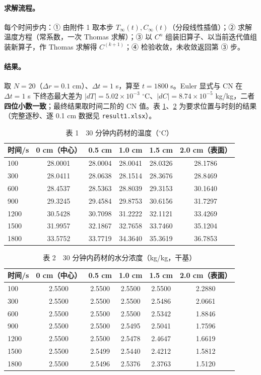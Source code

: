 \documentclass[12pt,a4paper]{ctexart}
\begin{document}
\paragraph{求解流程。} 每个时间步内：① 由附件 1 取本步 $T_\infty(t),C_\infty(t)$（分段线性插值）；② 求解温度方程（常系数，一次 Thomas 求解）；③ 以 $C^n$ 组装旧算子、以当前迭代值组装新算子，作 Thomas 求解得 $C^{(k+1)}$；④ 检验收敛，未收敛返回第 ③ 步。

\paragraph{结果。} 取 $N=20$（$\Delta r=0.1$ cm）、$\Delta t=1$ s，算至 $t=1800$ s。Euler 显式与 CN 在 $\Delta t=1$ s 下终态最大差为 $|dT|=5.02\times10^{-3}$ $^\circ$C、$|dC|=8.74\times10^{-5}$ kg/kg，二者\textbf{四位小数一致}；最终结果取时间二阶的 CN 值。表 \ref{tab:T}、\ref{tab:C} 为要求位置与时刻的结果（完整逐秒、逐 0.1 cm 数据见 \texttt{result1.xlsx}）。

\begin{table}[H]
\centering
\caption{表 1　30 分钟内药材的温度（$^\circ$C）}
\label{tab:T}
\begin{tabular}{lccccc}
\toprule
时间/s & 0 cm（中心） & 0.5 cm & 1.0 cm & 1.5 cm & 2.0 cm（表面） \\
\midrule
100  & 28.0001 & 28.0004 & 28.0041 & 28.0326 & 28.1786 \\
300  & 28.0411 & 28.0638 & 28.1514 & 28.3676 & 28.8469 \\
600  & 28.4537 & 28.5363 & 28.8039 & 29.3153 & 30.1640 \\
900  & 29.3245 & 29.4584 & 29.8753 & 30.6156 & 31.7297 \\
1200 & 30.5428 & 30.7098 & 31.2222 & 32.1121 & 33.4269 \\
1500 & 31.9957 & 32.1867 & 32.7658 & 33.7460 & 35.1204 \\
1800 & 33.5752 & 33.7719 & 34.3640 & 35.3619 & 36.7853 \\
\bottomrule
\end{tabular}
\end{table}

\begin{table}[H]
\centering
\caption{表 2　30 分钟内药材的水分浓度（kg/kg，干基）}
\label{tab:C}
\begin{tabular}{lccccc}
\toprule
时间/s & 0 cm（中心） & 0.5 cm & 1.0 cm & 1.5 cm & 2.0 cm（表面） \\
\midrule
100  & 2.5500 & 2.5500 & 2.5500 & 2.5500 & 2.2880 \\
300  & 2.5500 & 2.5500 & 2.5500 & 2.5486 & 2.0661 \\
600  & 2.5500 & 2.5500 & 2.5500 & 2.5342 & 1.8846 \\
900  & 2.5500 & 2.5500 & 2.5495 & 2.5041 & 1.7596 \\
1200 & 2.5500 & 2.5500 & 2.5478 & 2.4647 & 1.6619 \\
1500 & 2.5500 & 2.5499 & 2.5440 & 2.4212 & 1.5812 \\
1800 & 2.5500 & 2.5496 & 2.5376 & 2.3763 & 1.5120 \\
\bottomrule
\end{tabular}
\end{table}
\end{document}
